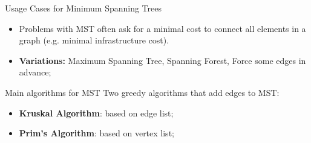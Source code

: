 \begin{frame}{Usage Cases for Minimum Spanning Trees}
  \begin{block}{}
    \begin{itemize}
      \item Problems with MST often ask for a minimal cost to connect all elements in a graph (e.g. minimal infrastructure cost).\medskip

      \item {\bf Variations:} Maximum Spanning Tree, Spanning Forest, Force some edges in advance;
    \end{itemize}
  \end{block}

  \begin{exampleblock}{Main algorithms for MST}
    Two greedy algorithms that add edges to MST:
    \begin{itemize}
      \item {\bf Kruskal Algorithm}: based on edge list;
      \item {\bf Prim's Algorithm}: based on vertex list;
    \end{itemize}
  \end{exampleblock}
\end{frame}

